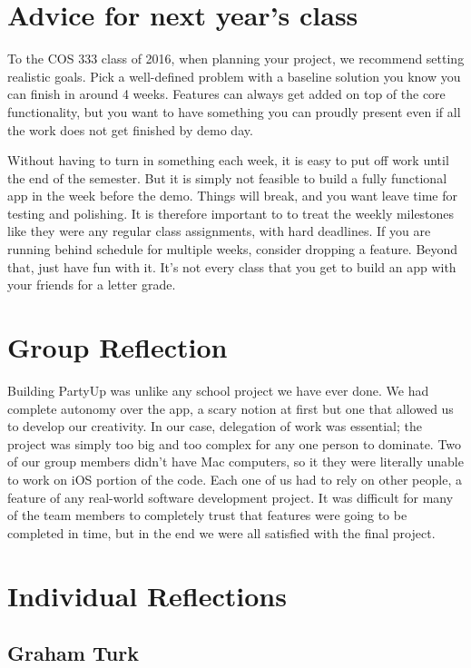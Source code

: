 \documentclass[12pt]{article}
\begin{document}
\section{Advice for next year's class}

To the COS 333 class of 2016, when planning your project, we recommend setting realistic goals. 
Pick a well-defined problem with a baseline solution you know you can finish in around 4 weeks.
Features can always get added on top of the core functionality, but you want to have something you
can proudly present even if all the work does not get finished by demo day.

Without having to turn in something each week, it is easy to put off work until the end of the semester.
But it is simply not feasible to build a fully functional app in the week before the demo. 
Things will break, and you want leave time for testing and polishing.
It is therefore important to to treat the weekly milestones like they were any regular class assignments, with hard deadlines. 
If you are running behind schedule for multiple weeks, consider dropping a feature.
Beyond that, just have fun with it. It's not every class that you get to build an app with your friends for a letter grade.

\section{Group Reflection}

Building PartyUp was unlike any school project we have ever done. 
We had complete autonomy over the app, a scary notion at first but one that allowed us to develop our creativity. 
In our case, delegation of work was essential; the project was simply too big and too complex for any one person to dominate. 
Two of our group members didn't have Mac computers, so it they were literally unable to work on iOS portion of the code. 
Each one of us had to rely on other people, a feature of any real-world software development project. 
It was difficult for many of the team members to completely trust that features were going to be completed in time, but in the end we were all satisfied with the final project.

\section{Individual Reflections}

\subsection{Graham Turk}
\end{document}

